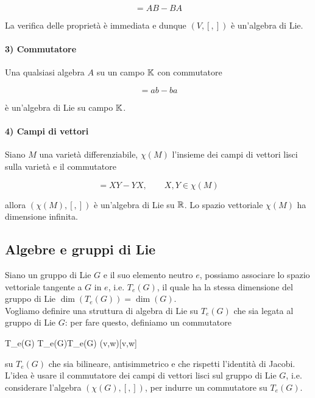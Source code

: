 \begin{equation}
	[A,B] = AB - BA
\end{equation}

La verifica delle proprietà è immediata e dunque $ (V,[,]) $ è un'algebra di Lie.

\paragraph{3) Commutatore}

Una qualsiasi algebra $ A $ su un campo $ \mathbb{K} $ con commutatore

\begin{equation}
	[a,b] = ab - ba
\end{equation}

è un'algebra di Lie su campo $ \mathbb{K} $.

\paragraph{4) Campi di vettori}

Siano $ M $ una varietà differenziabile, $ \chi(M) $ l'insieme dei campi di vettori lisci sulla varietà e il commutatore

\begin{equation}
	[X,Y] = XY - YX, \qquad X,Y \in \chi(M)
\end{equation}

allora $ (\chi(M),[,]) $ è un'algebra di Lie su $ \mathbb{R} $. Lo spazio vettoriale $ \chi(M) $ ha dimensione infinita.

\subsection{Algebre e gruppi di Lie}

Siano un gruppo di Lie $ G $ e il suo elemento neutro $ e $, possiamo associare lo spazio vettoriale tangente a $ G $ in $ e $, i.e. $ T_{e}(G) $, il quale ha la stessa dimensione del gruppo di Lie $ \dim(T_{e}(G)) = \dim(G) $.\\
Vogliamo definire una struttura di algebra di Lie su $ T_{e}(G) $ che sia legata al gruppo di Lie $ G $: per fare questo, definiamo un commutatore

\map{[,]}%
	{T_{e}(G) \times T_{e}(G)}{T_{e}(G)}%
	{(v,w)}{[v,w]}

su $ T_{e}(G) $ che sia bilineare, antisimmetrico e che rispetti l'identità di Jacobi.\\
L'idea è usare il commutatore dei campi di vettori lisci sul gruppo di Lie $ G $, i.e. considerare l'algebra $ (\chi(G),[,]) $, per indurre un commutatore su $ T_{e}(G) $.


